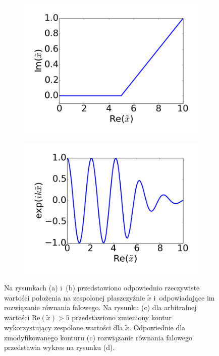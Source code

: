 \begin{figure}[tb]
	\begin{subfigure}{0.45\textwidth}
		\includegraphics[width=\textwidth]{images/pml/complex-x.png}
		\caption{}
		\label{fig:complex-contour}
	\end{subfigure}
	\begin{subfigure}{0.45\textwidth}
		\includegraphics[width=\textwidth]{images/pml/complex-x-wave.png}
		\caption{}
		\label{fig:absorbing-region}
	\end{subfigure}

	\caption{Na rysunkach (a) i~(b) przedstawiono odpowiednio rzeczywiste wartości położenia na zespolonej płaszczyźnie $\tilde{x}$ i~odpowiadające im rozwiązanie równania falowego. Na rysunku (c) dla arbitralnej  wartości $\textrm{Re}(\tilde{x})>5$ przedstawiono zmieniony kontur wykorzystujący zespolone wartości dla $\tilde{x}$. Odpowiednie dla zmodyfikowanego konturu (c)  rozwiązanie równania falowego przedstawia wykres na rysunku (d).}
	\label{fig:var-transform}
\end{figure}


